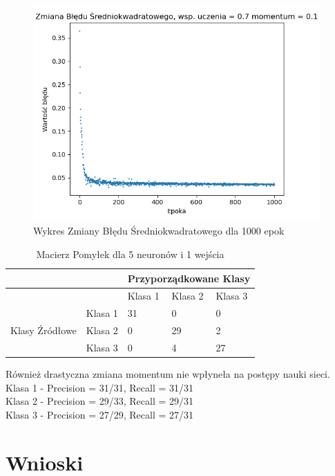 \documentclass[12pt]{article}
\begin{document}
\begin{figure}[!ht]
 \centering
 \includegraphics[width=11cm]{bladwspUczenia.png}
 \caption{Wykres Zmiany Błędu Średniokwadratowego dla 1000 epok}
 \vspace{-0.1cm}
 \label{WykresBlad20}
\end{figure}

\begin{table}
\caption{\label{tab:tablica19} Macierz Pomyłek dla 5 neuronów  i 1 wejścia}
\begin{tabular}{ |p{3cm}|p{3cm}|p{2cm}|p{2cm}|p{2cm}|  }
 \hline
 & & 
 \multicolumn{3}{|c|}{Przyporządkowane Klasy} \\
 \hline

   & & Klasa 1 & Klasa 2 & Klasa 3\\
 \hline
\multirow{3}{4em}{Klasy Źródłowe}
   & Klasa 1 & 31 & 0 & 0 \\ 
   & Klasa 2 & 0  & 29 & 2 \\
   & Klasa 3 & 0  & 4  & 27 \\
 \hline
\end{tabular}
\end{table}
Również drastyczna zmiana momentum nie wpłyneła na postępy nauki sieci.
\\Klasa 1 - Precision = 31/31, Recall = 31/31\\
Klasa 2 - Precision = 29/33, Recall = 29/31\\
Klasa 3 - Precision = 27/29, Recall = 27/31\\
\newpage


\newpage
\section {Wnioski}
\end{document}
